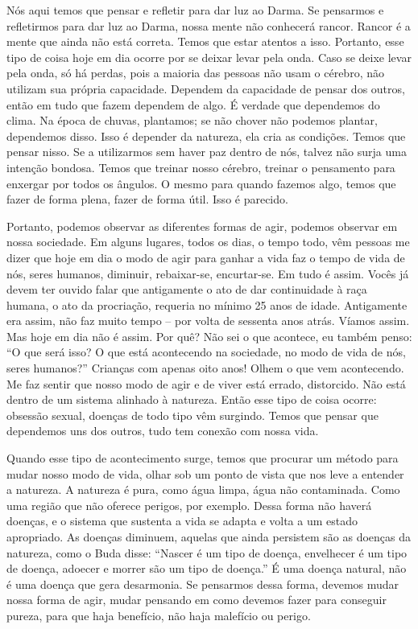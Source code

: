 Nós aqui temos que pensar e refletir para dar luz ao Darma. Se
pensarmos e refletirmos para dar luz ao Darma, nossa mente não
conhecerá rancor. Rancor é a mente que ainda não está correta. Temos
que estar atentos a isso. Portanto, esse tipo de coisa hoje em dia
ocorre por se deixar levar pela onda. Caso
se deixe levar pela onda, só há perdas, pois a maioria das pessoas não
usam o cérebro, não utilizam sua própria capacidade. Dependem da
capacidade de pensar dos outros, então em tudo que fazem dependem de
algo. É verdade que dependemos do clima. Na época de chuvas, plantamos;
se não chover não podemos plantar, dependemos disso. Isso é depender da
natureza, ela cria as condições. Temos que pensar nisso. Se
a utilizarmos sem haver paz dentro de nós,
talvez não surja uma intenção bondosa. Temos que treinar nosso cérebro,
treinar o pensamento para enxergar por todos os ângulos. O
mesmo para quando fazemos algo, temos que
fazer de forma plena, fazer de forma útil. Isso é parecido. 

Portanto, podemos observar as diferentes formas de agir, podemos
observar em nossa sociedade. Em alguns lugares, todos os dias, o tempo
todo, vêm pessoas me dizer que hoje em dia o modo de agir para ganhar a
vida faz o tempo de vida de nós, seres humanos, diminuir,
rebaixar-se, encurtar-se. Em tudo é assim. Vocês já devem ter
ouvido falar que antigamente o ato de dar
continuidade à raça humana, o ato da procriação, requeria no mínimo 25
anos de idade. Antigamente era assim, não faz muito tempo – por volta
de sessenta anos atrás. Víamos assim. Mas hoje em dia não é assim. Por
quê? Não sei o que acontece, eu também penso: “O que será isso? O que
está acontecendo na sociedade, no modo de vida de nós, seres humanos?”
Crianças com apenas oito anos! Olhem o que
vem acontecendo. Me faz sentir que nosso modo de agir e de viver está
errado, distorcido. Não está dentro de um sistema alinhado à natureza.
Então esse tipo de coisa ocorre: obsessão sexual, doenças de todo tipo
vêm surgindo. Temos que pensar que dependemos uns dos outros, tudo tem
conexão com nossa vida. 

Quando esse tipo de acontecimento surge, temos que procurar um
método para mudar nosso modo de vida, olhar sob um ponto de vista que
nos leve a entender a natureza. A natureza é pura, como água limpa,
água não contaminada. Como uma região que não oferece perigos, por
exemplo. Dessa forma não haverá doenças, e o sistema que
sustenta a vida se adapta e volta a um
estado apropriado. As doenças diminuem, aquelas que ainda persistem são
as doenças da natureza, como o Buda disse: “Nascer é um tipo de doença,
envelhecer é um tipo de doença, adoecer e morrer
são um tipo de doença.” É uma doença
natural, não é uma doença que gera desarmonia. Se pensarmos dessa
forma, devemos mudar nossa forma de agir, mudar pensando em como
devemos fazer para conseguir pureza, para que haja benefício, não haja
malefício ou perigo. 

